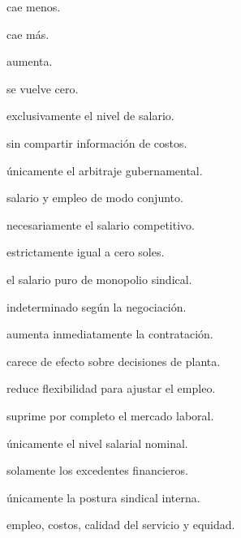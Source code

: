 \begin{opts}
    \item cae menos.
    \item cae más.
    \item aumenta.
    \item se vuelve cero.
\end{opts}

\begin{opts}
    \item exclusivamente el nivel de salario.
    \item sin compartir información de costos.
    \item únicamente el arbitraje gubernamental.
    \item salario y empleo de modo conjunto.
\end{opts}

\begin{opts}
    \item necesariamente el salario competitivo.
    \item estrictamente igual a cero soles.
    \item el salario puro de monopolio sindical.
    \item indeterminado según la negociación.
\end{opts}

\begin{opts}
    \item aumenta inmediatamente la contratación.
    \item carece de efecto sobre decisiones de planta.
    \item reduce flexibilidad para ajustar el empleo.
    \item suprime por completo el mercado laboral.
\end{opts}

\begin{opts}
    \item únicamente el nivel salarial nominal.
    \item solamente los excedentes financieros.
    \item únicamente la postura sindical interna.
    \item empleo, costos, calidad del servicio y equidad.
\end{opts}
